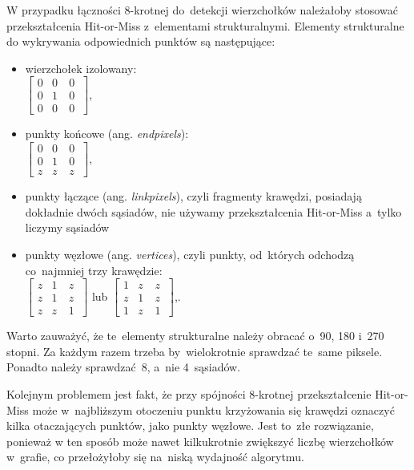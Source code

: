 \documentclass[a4paper,11pt,twoside,openright]{report}
\theoremstyle{definition}
\begin{document}
W przypadku łączności 8-krotnej do~detekcji wierzchołków należałoby stosować
przekształcenia Hit-or-Miss z~elementami strukturalnymi. Elementy strukturalne
do wykrywania odpowiednich punktów są następujące:

\begin{itemize}%
\item wierzchołek izolowany: \\
$
\begin{bmatrix}
0 & 0~& 0~\\
0 & 1~& 0~\\
0 & 0~& 0
\end{bmatrix}
$,
\item punkty końcowe (ang. \textit{endpixels}): \\
$
\begin{bmatrix}
0 & 0~& 0~\\
0 & 1~& 0~\\
z & z~& z
\end{bmatrix}
$,
\item punkty łączące (ang. \textit{linkpixels}), czyli fragmenty krawędzi, posiadają
dokładnie dwóch sąsiadów, nie używamy przekształcenia Hit-or-Miss a~tylko liczymy sąsiadów
\item punkty węzłowe (ang. \textit{vertices}), czyli punkty, od~których odchodzą co~najmniej trzy krawędzie: \\
$
\begin{bmatrix}
z & 1~& z~\\
z & 1~& z~\\
z & z~& 1
\end{bmatrix}
$ lub $
\begin{bmatrix}
1 & z~& z~\\
z & 1~& z~\\
1 & z~& 1
\end{bmatrix}
$,.
\end{itemize}

Warto zauważyć, że te~elementy strukturalne należy obracać o~90, 180 i~270 stopni.
Za każdym razem trzeba by~wielokrotnie sprawdzać te~same piksele. Ponadto należy
sprawdzać~8, a~nie 4~sąsiadów.

Kolejnym problemem jest fakt, że przy spójności 8-krotnej przekształcenie
Hit-or-Miss może w~najbliższym otoczeniu punktu krzyżowania się krawędzi oznaczyć
kilka otaczających punktów, jako punkty węzłowe. Jest to~złe rozwiązanie, ponieważ
w ten sposób może nawet kilkukrotnie zwiększyć liczbę wierzchołków w~grafie, co
przełożyłoby się na~niską wydajność algorytmu.
\end{document}
